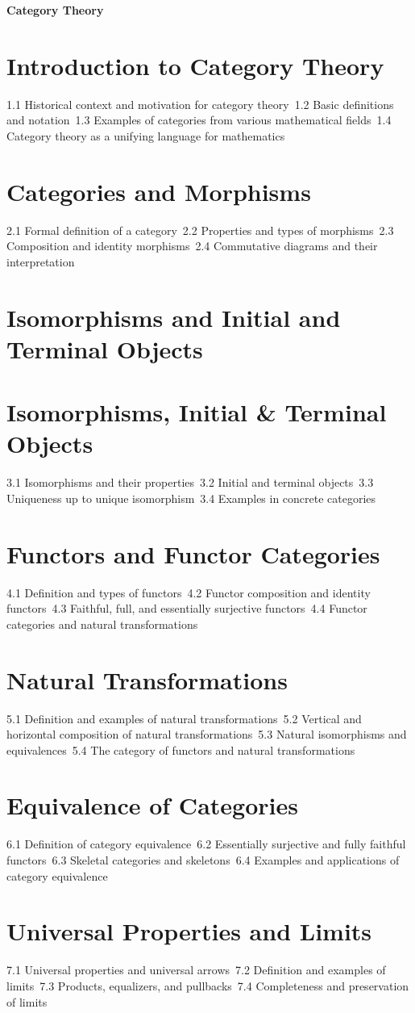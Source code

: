 {\LARGE \bf{Category Theory}}
\section{Introduction to Category Theory}
1.1 Historical context and motivation for category theory\
1.2 Basic definitions and notation\
1.3 Examples of categories from various mathematical fields\
1.4 Category theory as a unifying language for mathematics\
\section{Categories and Morphisms}
2.1 Formal definition of a category\
2.2 Properties and types of morphisms\
2.3 Composition and identity morphisms\
2.4 Commutative diagrams and their interpretation\
\section{Isomorphisms and Initial and Terminal Objects}
\section{Isomorphisms, Initial \& Terminal Objects}
3.1 Isomorphisms and their properties\
3.2 Initial and terminal objects\
3.3 Uniqueness up to unique isomorphism\
3.4 Examples in concrete categories\
\section{Functors and Functor Categories}
4.1 Definition and types of functors\
4.2 Functor composition and identity functors\
4.3 Faithful, full, and essentially surjective functors\
4.4 Functor categories and natural transformations\
\section{Natural Transformations}
5.1 Definition and examples of natural transformations\
5.2 Vertical and horizontal composition of natural transformations\
5.3 Natural isomorphisms and equivalences\
5.4 The category of functors and natural transformations\
\section{Equivalence of Categories}
6.1 Definition of category equivalence\
6.2 Essentially surjective and fully faithful functors\
6.3 Skeletal categories and skeletons\
6.4 Examples and applications of category equivalence\
\section{Universal Properties and Limits}
7.1 Universal properties and universal arrows\
7.2 Definition and examples of limits\
7.3 Products, equalizers, and pullbacks\
7.4 Completeness and preservation of limits\

